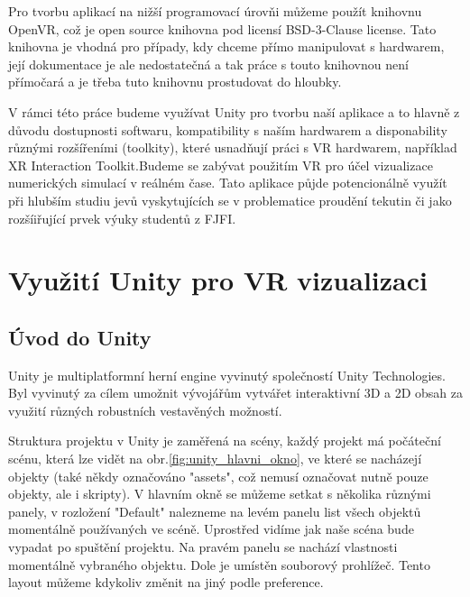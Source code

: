 \documentclass[a4paper,oneside,12pt]{book}
\begin{document}
Pro tvorbu aplikací na nižší programovací úrovňi můžeme použít knihovnu OpenVR\cite{openvrdok}, což je open source knihovna pod licensí BSD-3-Clause license\cite{openvrdok}. Tato knihovna je vhodná pro případy, kdy chceme přímo manipulovat s hardwarem\cite{openvrdok}, její dokumentace je ale nedostatečná a tak práce s touto knihovnou není přímočará a je třeba tuto knihovnu prostudovat do hloubky.

V rámci této práce budeme využívat Unity pro tvorbu naší aplikace a to hlavně z důvodu dostupnosti softwaru, kompatibility s naším hardwarem\cite{unitypodpora} a disponability různými rozšířeními (toolkity), které usnadňují práci s VR hardwarem, například XR Interaction Toolkit\cite{unityxrinteract}.Budeme se zabývat použitím VR pro účel vizualizace numerických simulací v reálném čase. Tato aplikace půjde potencionálně využít při hlubším studiu jevů vyskytujících se v problematice proudění tekutin či jako rozšíiřující prvek výuky studentů z FJFI.



%

%


\chapter{Využití Unity pro VR vizualizaci}
\section{Úvod do Unity}
Unity je multiplatformní herní engine vyvinutý společností Unity Technologies. Byl vyvinutý za cílem umožnit vývojářům vytvářet interaktivní 3D a 2D obsah za využití různých robustních vestavěných možností.

Struktura projektu v Unity je zaměřená na scény, každý projekt má počáteční scénu, která lze vidět na obr.\ref{fig:unity_hlavni_okno}, ve které se nacházejí objekty (také někdy označováno "assets", což nemusí označovat nutně pouze objekty, ale i skripty). V hlavním okně se můžeme setkat s několika různými panely, v rozložení "Default" nalezneme na levém panelu list všech objektů momentálně používaných ve scéně. Uprostřed vidíme jak naše scéna bude vypadat po spuštění projektu. Na pravém panelu se nachází vlastnosti momentálně vybraného objektu. Dole je umístěn souborový prohlížeč. Tento layout můžeme kdykoliv změnit na jiný podle preference.
\end{document}
